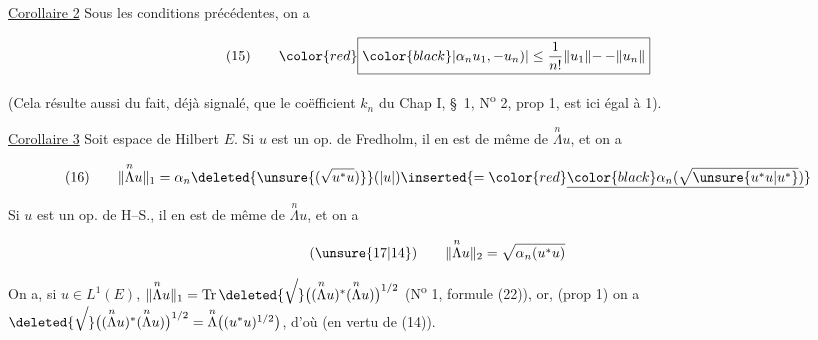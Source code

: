 {\reversemarginpar{}}
\uline{Corollaire 2} Sous les conditions précédentes, on a

\[
\begin{array}{@{}l@{\qquad}l@{}}
(15) & {\color{red}\boxed{{\color{black}\displaystyle |\alpha_n u_1,\mathord{-}u_n)|\leq\frac1{n!}\lVert u_1\rVert\mathord{-}\,\mathord{-}\lVert u_n\rVert}}}
\end{array}
\]

(Cela résulte aussi du fait, déjà signalé, que le coëfficient $k_n$ du Chap I, \S~1, N\textsuperscript{o} 2, prop 1, est ici égal à 1).

{\reversemarginpar{}}
\uline{Corollaire 3} Soit   espace de Hilbert $E$.  Si $u$ est un op. de Fredholm, il en est de même de $\overset{n}{\Lambda}u$, et on a

\[
\begin{array}{@{}l@{\qquad}l@{}}
(16) & \displaystyle \lVert\overset{n}{\Lambda}u\rVert_1=\alpha_n\deleted{\unsure{(\sqrt{u^*u})}}(|u|)\inserted{={\color{red}\underline{{\color{black}\alpha_n(\sqrt{\unsure{u^*u|u^*}})}}}}
\end{array}
\]

Si $u$ est un op. de H--S., il en est de même de $\overset{n}{\Lambda}u$, et on a

\[
\begin{array}{@{}l@{\qquad}l@{}}
(\unsure{17|14}) & \displaystyle \lVert\overset{n}{\Lambda}u\rVert_2=\sqrt{\alpha_n(u^*u)}
\end{array}
\]

On a, si $u\in L^1(E)$, $\lVert\overset{n}{\Lambda}u\rVert_1=\operatorname{Tr}\deleted{\sqrt{\vphantom{(\overset{n}{\Lambda}u)^*}}}\bigl((\overset{n}{\Lambda}u)^*(\overset{n}{\Lambda}u)\bigr)^{1/2}$ (N\textsuperscript{o} 1, formule (22)), or, (prop 1) on a $\deleted{\sqrt{\vphantom{(\overset{n}{\Lambda}u)^*}}}\bigl((\overset{n}{\Lambda}u)^*(\overset{n}{\Lambda}u)\bigr)^{1/2}=\overset{n}{\Lambda}\bigl((u^*u)^{1/2}\bigr)$, d'où   (en vertu de (14)).

